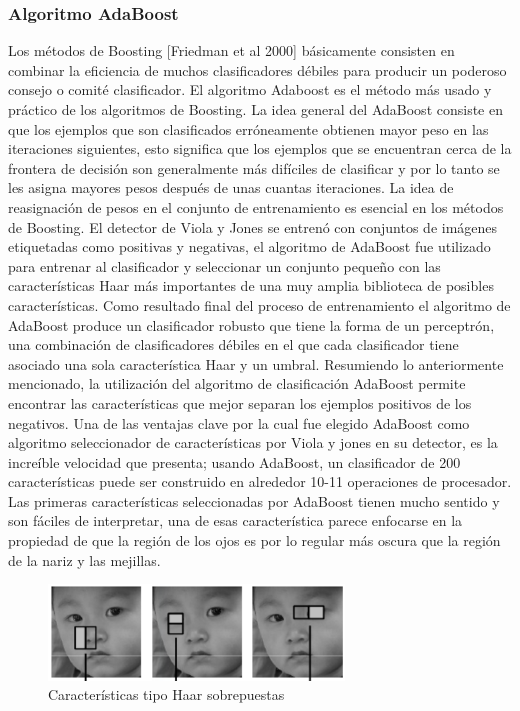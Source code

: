    \subsubsection{Algoritmo AdaBoost}
   Los métodos de Boosting [Friedman et al 2000] básicamente consisten en combinar la eficiencia de muchos clasificadores débiles para producir un poderoso consejo o comité clasificador. El algoritmo Adaboost es el método más usado y práctico de los algoritmos de Boosting. La idea general del AdaBoost consiste en que los ejemplos que son clasificados erróneamente obtienen mayor peso en las iteraciones siguientes, esto significa que los ejemplos que se encuentran cerca de la frontera de decisión son generalmente más difíciles de clasificar y por lo tanto se les asigna mayores pesos después de unas cuantas iteraciones. La idea de reasignación de pesos en el conjunto de entrenamiento es esencial en los métodos de Boosting.
   El detector de Viola y Jones se entrenó con conjuntos de imágenes etiquetadas como positivas y negativas, el algoritmo de AdaBoost fue utilizado para entrenar al clasificador y seleccionar un conjunto pequeño con las características Haar más importantes de una muy amplia biblioteca de posibles características. Como resultado final del proceso de entrenamiento el algoritmo de AdaBoost produce un clasificador robusto que tiene la forma de un perceptrón, una combinación de clasificadores débiles en el que cada clasificador tiene asociado una sola característica Haar y un umbral. Resumiendo lo anteriormente mencionado, la utilización del algoritmo de clasificación AdaBoost permite encontrar las características que mejor separan los ejemplos positivos de los negativos. Una de las ventajas clave por la cual fue elegido AdaBoost como algoritmo seleccionador de características por Viola y jones en su detector, es la increíble velocidad que presenta; usando AdaBoost, un clasificador de 200 características puede ser construido en alrededor 10-11 operaciones de procesador. Las primeras características seleccionadas por AdaBoost tienen mucho sentido y son fáciles de interpretar, una de esas característica parece enfocarse en la propiedad de que la región de los ojos es por lo regular más oscura que la región de la nariz y las mejillas.
   \begin{figure}[htbp]
   	\centering
   	\includegraphics[width=0.7\textwidth]{./pictures/adaboost}
   	\caption{Características tipo Haar sobrepuestas}\label{fig: figura}
   \end{figure}
   
